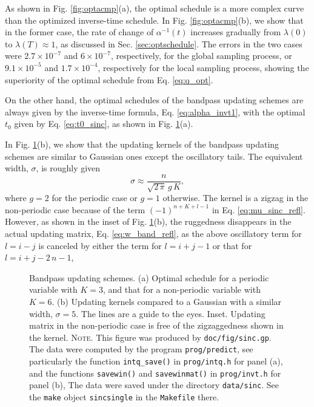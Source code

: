 \documentclass[reprint, floatfix]{revtex4-1}
\newcommand{\note}[1]{{\color{DarkGreen}\footnotesize \textsc{Note.} #1}}
\begin{document}
As shown in Fig. \ref{fig:optacmp}(a),
the optimal schedule is a more complex curve
than the optimized inverse-time schedule.
%
In Fig. \ref{fig:optacmp}(b),
we show that in the former case,
the rate of change of $\alpha^{-1}(t)$
increases gradually
from $\lambda(0)$ to $\lambda(T) \approx 1$,
as discussed in Sec. \ref{sec:optschedule}.
%
The errors in the two cases were
$2.7 \times 10^{-7}$
and
$6 \times 10^{-7}$,
respectively,
for the global sampling process,
%
or
$9.1 \times 10^{-5}$
and
$1.7 \times 10^{-4}$,
respectively
for the local sampling process,
showing the superiority of
the optimal schedule from Eq. \eqref{eq:q_opt}.



On the other hand,
the optimal schedules of the bandpass updating schemes
are always given by the inverse-time formula,
Eq. \eqref{eq:alpha_invt1},
with the optimal $t_0$
given by Eq. \eqref{eq:t0_sinc},
as shown in Fig. \ref{fig:sinc}(a).


In Fig. \ref{fig:sinc}(b),
we show that the updating kernels
of the bandpass updating schemes
are similar to Gaussian ones
except the oscillatory tails.
%
The equivalent width, $\sigma$, is roughly given
\begin{equation}
  \sigma
  \approx
  \frac
  {
    n
  }
  {
    \sqrt{ 2 \, \pi } \, g \, K
  }
  ,
\label{eq:sigma_equiv}
\end{equation}
where $g = 2$ for the periodic case
or $g = 1$ otherwise.
%
The kernel is a zigzag in the non-periodic case
because of the term $(-1)^{n+K+l-1}$
in Eq. \eqref{eq:mu_sinc_refl}.
%
However, as shown in the inset of Fig. \ref{fig:sinc}(b),
the ruggedness disappears
in the actual updating matrix, Eq. \eqref{eq:w_band_refl},
as the above oscillatory term for $l = i - j$
is canceled by either the term for $l = i + j - 1$
or that for $l = i + j - 2 \, n - 1$,


\begin{figure}[h]
\begin{center}
  \caption{
    \label{fig:sinc}
    Bandpass updating schemes.
    (a) Optimal schedule for a periodic variable
    with $K = 3$,
    and that for a non-periodic variable
    with $K = 6$.
    (b) Updating kernels
    compared to a Gaussian with a similar width,
    $\sigma = 5$.
    The lines are a guide to the eyes.
    Inset. Updating matrix in the non-periodic case
    is free of the zigzaggedness shown in the kernel.
    \note{This figure was produced by \texttt{doc/fig/sinc.gp}.
      The data were computed by the program \texttt{prog/predict},
      see particularly the function \texttt{intq\_save()}
      in \texttt{prog/intq.h} for panel (a),
      and the functions \texttt{savewin()}
      and \texttt{savewinmat()}
      in \texttt{prog/invt.h} for panel (b),
      The data were saved under the directory \texttt{data/sinc}.
      See the \texttt{make} object \texttt{sincsingle}
      in the \texttt{Makefile} there.
    }
  }
\end{center}
\end{figure}
\end{document}
